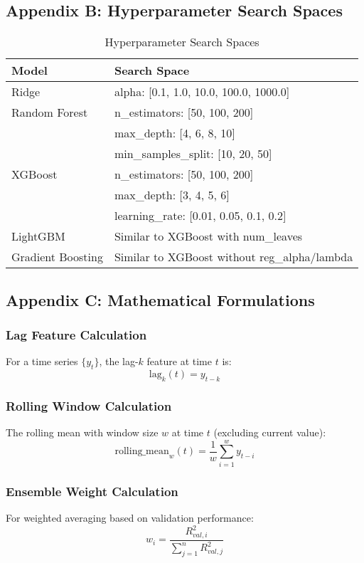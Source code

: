 \documentclass[12pt,a4paper]{article}
\begin{document}
\subsection{Appendix B: Hyperparameter Search Spaces}

\begin{table}[h]
\centering
\begin{tabular}{@{}ll@{}}
\toprule
\textbf{Model} & \textbf{Search Space} \\
\midrule
Ridge & alpha: [0.1, 1.0, 10.0, 100.0, 1000.0] \\
Random Forest & n\_estimators: [50, 100, 200] \\
& max\_depth: [4, 6, 8, 10] \\
& min\_samples\_split: [10, 20, 50] \\
XGBoost & n\_estimators: [50, 100, 200] \\
& max\_depth: [3, 4, 5, 6] \\
& learning\_rate: [0.01, 0.05, 0.1, 0.2] \\
LightGBM & Similar to XGBoost with num\_leaves \\
Gradient Boosting & Similar to XGBoost without reg\_alpha/lambda \\
\bottomrule
\end{tabular}
\caption{Hyperparameter Search Spaces}
\end{table}

\subsection{Appendix C: Mathematical Formulations}

\subsubsection{Lag Feature Calculation}
For a time series $\{y_t\}$, the lag-$k$ feature at time $t$ is:
\begin{equation}
\text{lag}_k(t) = y_{t-k}
\end{equation}

\subsubsection{Rolling Window Calculation}
The rolling mean with window size $w$ at time $t$ (excluding current value):
\begin{equation}
\text{rolling\_mean}_w(t) = \frac{1}{w} \sum_{i=1}^{w} y_{t-i}
\end{equation}

\subsubsection{Ensemble Weight Calculation}
For weighted averaging based on validation performance:
\begin{equation}
w_i = \frac{R^2_{val,i}}{\sum_{j=1}^{n} R^2_{val,j}}
\end{equation}
\end{document}
